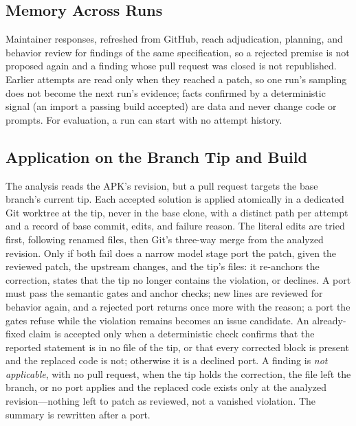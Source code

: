 \documentclass[conference]{IEEEtran}
\begin{document}
\subsection{Memory Across Runs}

Maintainer responses, refreshed from GitHub, reach adjudication, planning, and
behavior review for findings of the same specification, so a rejected premise
is not proposed again and a finding whose pull request was closed is not
republished. Earlier attempts are read only when they reached a patch, so one
run's sampling does not become the next run's evidence; facts confirmed by a
deterministic signal (an import a passing build accepted) are data and never
change code or prompts. For evaluation, a run can start with no attempt
history.

\subsection{Application on the Branch Tip and Build}

The analysis reads the APK's revision, but a pull request targets the base
branch's current tip. Each accepted solution is applied atomically in a
dedicated Git worktree at the tip, never in the base clone, with a distinct
path per attempt and a record of base commit, edits, and failure reason. The
literal edits are tried first, following renamed files, then Git's three-way
merge from the analyzed revision. Only if both fail does a narrow model stage
port the patch, given the reviewed patch, the upstream changes, and the tip's
files: it re-anchors the correction, states that the tip no longer contains the
violation, or declines. A port must pass the semantic gates and anchor checks;
new lines are reviewed for behavior again, and a rejected port returns once
more with the reason; a port the gates refuse while the violation remains
becomes an issue candidate. An already-fixed claim is accepted only when a
deterministic check confirms that the reported statement is in no file of the
tip, or that every corrected block is present and the replaced code is not;
otherwise it is a declined port. A finding is \emph{not applicable}, with no
pull request, when the tip holds the correction, the file left the branch, or
no port applies and the replaced code exists only at the analyzed
revision---nothing left to patch as reviewed, not a vanished violation. The
summary is rewritten after a port.
\end{document}
